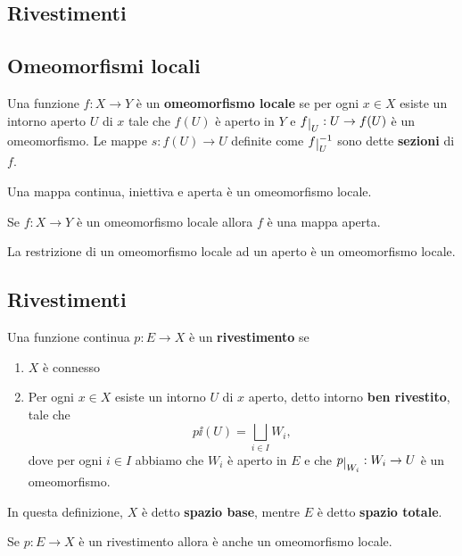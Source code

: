 \begin{multicols*}{2}
\section{Rivestimenti}
\subsection{Omeomorfismi locali}
\begin{definition}
Una funzione $f:X\to Y$ è un \textbf{omeomorfismo locale} se per ogni $x\in X$ esiste un intorno aperto $U$ di $x$ tale che $f(U)$ è aperto in $Y$ e $f\res U:U\to f(U)$ è un omeomorfismo.
Le mappe $s:f(U)\to U$ definite come $f\res{U}\ii$ sono dette \textbf{sezioni} di $f$.
\end{definition}

\begin{remark}\label{ContinuaIniettivaEApertaImplicaOmeomorfismoLocale}
Una mappa continua, iniettiva e aperta è un omeomorfismo locale.
\end{remark}

\begin{proposition}
Se $f:X\to Y$ è un omeomorfismo locale allora $f$ è una mappa aperta.
\end{proposition}

\begin{remark}
La restrizione di un omeomorfismo locale ad un aperto è un omeomorfismo locale.
\end{remark}


\subsection{Rivestimenti}
\begin{definition}[Rivestimento]
Una funzione continua $p:E\to X$ è un \textbf{rivestimento} se
\begin{enumerate}[noitemsep]
\item $X$ è connesso
\item Per ogni $x\in X$ esiste un intorno $U$ di $x$ aperto, detto intorno \textbf{ben rivestito}, tale che
\[p\ii(U)=\bigsqcup_{i\in I}W_i,\]
dove per ogni $i\in I$ abbiamo che $W_i$ è aperto in $E$ e che $p\res {W_i}:W_i\to U$ è un omeomorfismo.
\end{enumerate}
In questa definizione, $X$ è detto \textbf{spazio base}, mentre $E$ è detto \textbf{spazio totale}.
\end{definition}

\begin{proposition}\label{RivestimentoImplicaOmeomorfismoLocale}
Se $p:E\to X$ è un rivestimento allora è anche un omeomorfismo locale.
\end{proposition}


\end{multicols*}
